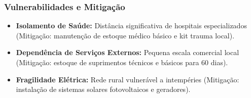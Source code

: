 \subsubsection{Vulnerabilidades e
Mitigação}

\begin{itemize}
\tightlist
\item
  \textbf{Isolamento de Saúde:} Distância significativa de hospitais
  especializados (Mitigação: manutenção de estoque médico básico e kit
  trauma local).
\item
  \textbf{Dependência de Serviços Externos:} Pequena escala comercial
  local (Mitigação: estoque de suprimentos técnicos e básicos para 60
  dias).
\item
  \textbf{Fragilidade Elétrica:} Rede rural vulnerável a intempéries
  (Mitigação: instalação de sistemas solares fotovoltaicos e geradores).
\end{itemize}


